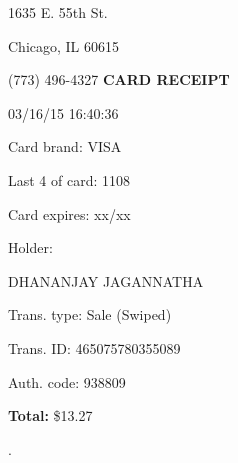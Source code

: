\documentclass[12pt]{article}
\begin{document}
\parindent=0pt
\vskip 0.2cm
{\small 1635 E. 55th St.}


{\small Chicago, IL 60615}


{\small (773) 496-4327}
\vskip 0.5cm
{\Large \sf \bf CARD RECEIPT}

03/16/15 16:40:36

\vskip 0.5cm
{\small Card brand: VISA}

{\small Last 4 of card: 1108}

{\small Card expires: xx/xx}

{\small Holder:

 \textsf{DHANANJAY JAGANNATHA}}

{\small Trans. type: Sale (Swiped)}

{\small Trans. ID:} {\tiny 465075780355089}

{\small Auth. code:} {\tiny 938809}

\textbf{\small Total:} \$13.27


\vskip 2.0cm

.
\end{document}
